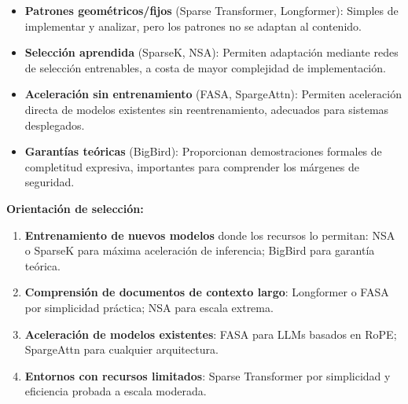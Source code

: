 \begin{itemize}[leftmargin=*]
    \item \textbf{Patrones geométricos/fijos} (Sparse Transformer, Longformer): Simples de implementar y analizar, pero los patrones no se adaptan al contenido.
    \item \textbf{Selección aprendida} (SparseK, NSA): Permiten adaptación mediante redes de selección entrenables, a costa de mayor complejidad de implementación.
    \item \textbf{Aceleración sin entrenamiento} (FASA, SpargeAttn): Permiten aceleración directa de modelos existentes sin reentrenamiento, adecuados para sistemas desplegados.
    \item \textbf{Garantías teóricas} (BigBird): Proporcionan demostraciones formales de completitud expresiva, importantes para comprender los márgenes de seguridad.
\end{itemize}

\textbf{Orientación de selección:}
\begin{enumerate}[leftmargin=*]
    \item \textbf{Entrenamiento de nuevos modelos} donde los recursos lo permitan: NSA o SparseK para máxima aceleración de inferencia; BigBird para garantía teórica.
    \item \textbf{Comprensión de documentos de contexto largo}: Longformer o FASA por simplicidad práctica; NSA para escala extrema.
    \item \textbf{Aceleración de modelos existentes}: FASA para LLMs basados en RoPE; SpargeAttn para cualquier arquitectura.
    \item \textbf{Entornos con recursos limitados}: Sparse Transformer por simplicidad y eficiencia probada a escala moderada.
\end{enumerate}

